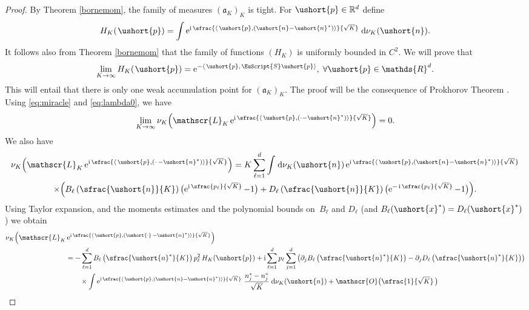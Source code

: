 \documentclass[JEP,XML,SOM,Unicode]{cedram}
\newcommand{\scaleto}[2]{#1}
\let\mathcal\mathscr
\numberwithin{equation}{section}
\theoremstyle{plain}
\theoremstyle{definition}
\newcommand{\real}{\mathbb{R}}
\newcommand{\sK}{K}
\newcommand{\gen}{\mathscr{L}_{\sK}}
\newcommand{\vecn}{\ushort{n}}
\newcommand{\vecnf}{\ushort{n}^*}
\newcommand{\svecnf}{\ushort{n}^*}
\newcommand{\vecxf}{\ushort{x}^*}
\newcommand{\vp}{\ushort{p}}
\newcommand{\nuk}{\nu_{K}}\let\snuk\nuk
\newcommand{\e}{\operatorname{e}}
\newcommand{\ii}{\operatorname{i}}
\newcommand{\dd}{\hspace{1pt}\mathrm{d}}
\begin{document}
\begin{proof}
By Theorem \ref{bornemom}, the family of measures $(\mathfrak{a}_{\sK})_{\sK}$ is tight.
For $\vp\in \real^d$ define
\[
H_{\sK}(\hspace{1pt}\vp)=\int \e^{\ii \sfrac{\langle\, \vp,(\vecn-\svecnf)\rangle}{\sqrt{K}}}\dd \nuk(\vecn).
\]
It follows also from Theorem \ref{bornemom} that the family of functions $(H_{\sK})$ is uniformly bounded in $C^{2}$.
We will prove that
\begin{equation}\label{pelouse}
\lim_{\sK\to\infty}H_{\sK}(\hspace{1pt}\vp)=\e^{-\langle\, \vp,\hspace{1pt}\EuScript{S}\vp\rangle},\;\forall \vp\in \mathds{R}^d.
\end{equation}
This will entail that there is only one weak accumulation point for $(\mathfrak{a}_{\sK})_{\sK}$.
The proof will be the consequence of Prokhorov Theorem \cite{patrick}.
Using \eqref{eq:miracle} and \eqref{eq:lambda0}, we have
\[
\lim_{\sK\to\infty}\nuk\!\left(\gen \e^{\ii\sfrac{\langle\, \vp,(\cdot-\svecnf)\rangle}{\sqrt{K}}}\right)=0.
\]
We also have
\begin{multline*}
\nuk\!\left(\gen \e^{\ii \sfrac{\langle\, \vp,(\cdot\,-\svecnf)\rangle}{\sqrt{K}}}\right)
=
K\sum_{\ell=1}^{d}\int\dd\nuk(\vecn)\e^{\ii\sfrac{\langle\, \vp,(\vecn-\svecnf)\rangle}{\sqrt{K}}} \\
\times \Bigl(B_{\ell}\left(\sfrac{\vecn}{K}\right) \bigl(\e^{\ii\sfrac{p_{\ell}}{\sqrt{K}}}-1 \bigr)
+ D_{\ell}\left(\sfrac{\vecn}{K}\right) \bigl(\e^{-\ii\sfrac{p_{\ell}}{\sqrt{K}}}-1 \bigr)\Bigr).
\end{multline*}
Using Taylor expansion, and the moments estimates and the polynomial bounds on~$B_{\ell}$ and $D_{\ell}$
(and $B_{\ell}(\vecxf)=D_{\ell}(\vecxf)$) we obtain
\begin{align*}
\nuk\Bigl(\gen& \e^{\ii\sfrac{\langle\, \vp,(\ushort{\cdot}\,-\svecnf)\rangle}{\sqrt{K}}}\Bigr)
\\
& =-\sum_{\ell=1}^{d}B_{\ell}\left(\sfrac{\vecnf}{K}\right) p_{\ell}^2\,H_{\sK}(\vp)+ \ii\sum_{\ell=1}^{d} p_{\ell}\sum_{j=1}^{d}
\left(\partial_{j}B_{\ell}\left(\sfrac{\vecnf}{K}\right)-\partial_{j}D_{\ell}\left(\sfrac{\vecnf}{K}\right)\right)\\
& \qquad \times \int \e^{\ii\sfrac{\langle\, \vp, (\vecn-\svecnf)\rangle}{\sqrt{K}}}\,
\frac{n_{j}^{\scaleto{*}{2.5pt}}-n_{j}^{\scaleto{*}{2.5pt}}}{\sqrt{K}}\, \dd\nuk(\vecn)
+\mathcal{O}\bigl(\sfrac{1}{\sqrt{K}}\,\bigr)\\

\end{align*}
\end{proof}
\end{document}
